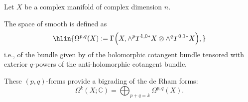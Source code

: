 
\begin{definition} \label{definition:p_q_form_on_a_complex_manifold}
    Let $X$ be a complex manifold of complex dimension $n$.

    The space of smooth  is defined as
    $$\hlin{\Omega^{p,q}(X) := \Gamma\Big(X, \wedge^p T^{1,0*} X \otimes \wedge^q T^{0,1*} X\Big),}$$
    i.e.,  of the bundle given by  of the holomorphic cotangent bundle tensored with exterior $q$-powers of the anti-holomorphic cotangent bundle.

    These $(p,q)$-forms provide a bigrading of the  de Rham forms:
    $$ \Omega^k(X; \mathbb{C}) = \bigoplus_{p+q=k} \Omega^{p,q}(X).  $$
\end{definition}
